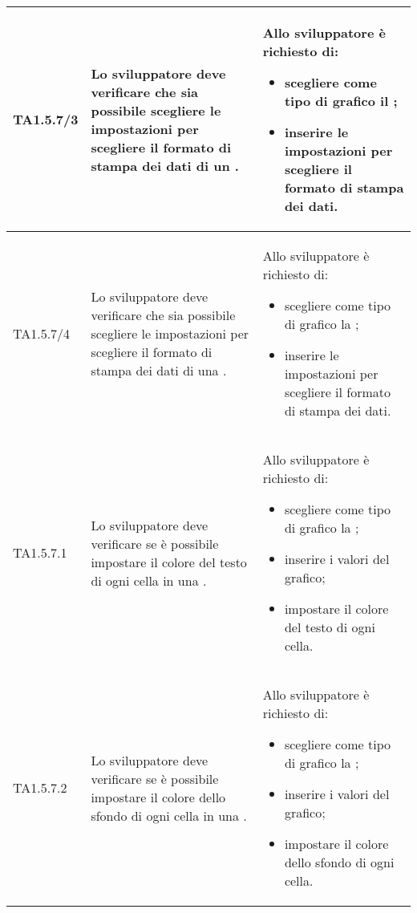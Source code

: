 \begin{longtabu}{| X[0.5] | X | X |}
	TA1.5.7/3 & Lo sviluppatore deve verificare che sia possibile scegliere le impostazioni per scegliere il formato di stampa dei dati di un .

		& Allo sviluppatore è richiesto di:
		\begin{itemize}
			\item scegliere come tipo di grafico il ;
			\item inserire le impostazioni per scegliere il formato di stampa dei dati.
		\end{itemize}
\\ \hline

	TA1.5.7/4 & Lo sviluppatore deve verificare che sia possibile scegliere le impostazioni per scegliere il formato di stampa dei dati di una .

		& Allo sviluppatore è richiesto di:
		\begin{itemize}
			\item scegliere come tipo di grafico la ;
			\item inserire le impostazioni per scegliere il formato di stampa dei dati.
		\end{itemize}
\\ \hline

	TA1.5.7.1 & Lo sviluppatore deve verificare se è possibile impostare il colore del testo di ogni cella in una .

		& Allo sviluppatore è richiesto di:
		\begin{itemize}
			\item scegliere come tipo di grafico la ;
			\item inserire i valori del grafico;
			\item impostare il colore del testo di ogni cella.
		\end{itemize}
\\ \hline

	TA1.5.7.2 & Lo sviluppatore deve verificare se è possibile impostare il colore dello sfondo di ogni cella in una .

		& Allo sviluppatore è richiesto di:
		\begin{itemize}
			\item scegliere come tipo di grafico la ;
			\item inserire i valori del grafico;
			\item impostare il colore dello sfondo di ogni cella.
		\end{itemize}
\\ \hline


\end{longtabu}
